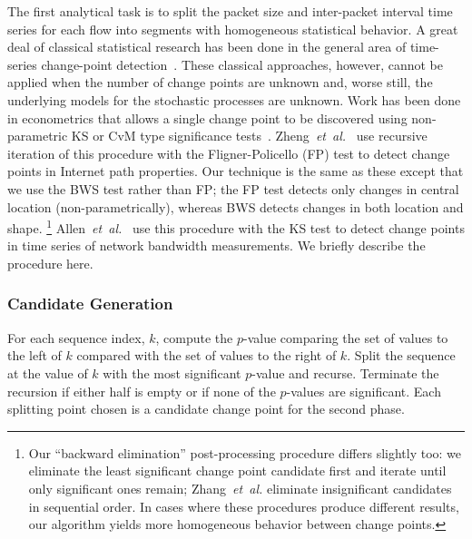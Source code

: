 \documentclass[conference]{IEEEtran}
\newcommand{\caps}[1]{{\small{#1}}}
\begin{document}
The first analytical task is to split the packet size and inter-packet interval time series for each flow into segments with homogeneous statistical behavior. A great deal of classical statistical research has been done in the general area of time-series change-point detection~\cite{Basseville93}. These classical approaches, however, cannot be applied when the number of change points are unknown and, worse still, the underlying models for the stochastic processes are unknown. Work has been done in econometrics that allows a single change point to be discovered using non-parametric \caps{KS} or \caps{CvM} type significance tests~\cite{Inoue01}. Zheng~\textit{et~al.}~\cite{Zhang01} use recursive iteration of this procedure with the Fligner-Policello (\caps{FP}) test to detect change points in Internet path properties. Our technique is the same as these except that we use the \caps{BWS} test rather than \caps{FP}; the \caps{FP} test detects only changes in central location (non-parametrically), whereas \caps{BWS} detects changes in both location and shape.%
\footnote{Our ``backward elimination'' post-processing procedure differs slightly too: we eliminate the least significant change point candidate first and iterate until only significant ones remain; Zhang~\textit{et~al.} eliminate insignificant candidates in sequential order. In cases where these procedures produce different results, our algorithm yields more homogeneous behavior between change points.} %
Allen~\textit{et~al.}~\cite{Allen07} use this procedure with the \caps{KS} test to detect change points in time series of network bandwidth measurements. We briefly describe the procedure here.

\subsubsection{Candidate Generation}
For each sequence index, $k$, compute the $p$-value comparing the set of values to the left of $k$ compared with the set of values to the right of $k$. Split the sequence at the value of $k$ with the most significant $p$-value and recurse. Terminate the recursion if either half is empty or if none of the $p$-values are significant. Each splitting point chosen is a candidate change point for the second phase.
\end{document}
